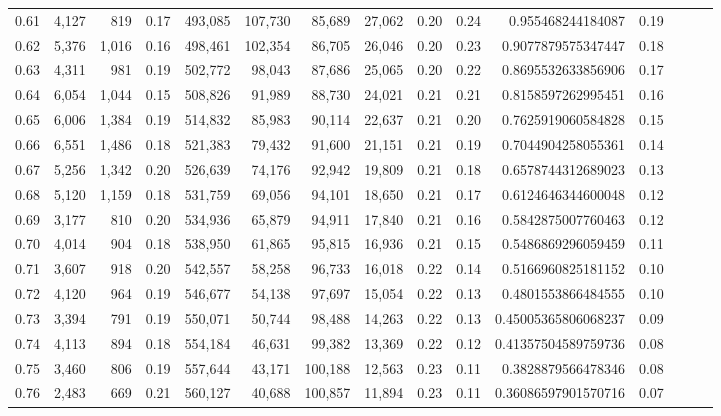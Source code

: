 \begin{tabular}{rrrrrrrrrrrrrrr}
0.61 &   4,127 &    819 &  0.17 &  493,085 &  107,730 &   85,689 &   27,062 &  0.20 &  0.24 &    0.955468244184087 &      0.19 \\
0.62 &   5,376 &  1,016 &  0.16 &  498,461 &  102,354 &   86,705 &   26,046 &  0.20 &  0.23 &   0.9077879575347447 &      0.18 \\
0.63 &   4,311 &    981 &  0.19 &  502,772 &   98,043 &   87,686 &   25,065 &  0.20 &  0.22 &   0.8695532633856906 &      0.17 \\
0.64 &   6,054 &  1,044 &  0.15 &  508,826 &   91,989 &   88,730 &   24,021 &  0.21 &  0.21 &   0.8158597262995451 &      0.16 \\
0.65 &   6,006 &  1,384 &  0.19 &  514,832 &   85,983 &   90,114 &   22,637 &  0.21 &  0.20 &   0.7625919060584828 &      0.15 \\
0.66 &   6,551 &  1,486 &  0.18 &  521,383 &   79,432 &   91,600 &   21,151 &  0.21 &  0.19 &   0.7044904258055361 &      0.14 \\
0.67 &   5,256 &  1,342 &  0.20 &  526,639 &   74,176 &   92,942 &   19,809 &  0.21 &  0.18 &   0.6578744312689023 &      0.13 \\
0.68 &   5,120 &  1,159 &  0.18 &  531,759 &   69,056 &   94,101 &   18,650 &  0.21 &  0.17 &   0.6124646344600048 &      0.12 \\
0.69 &   3,177 &    810 &  0.20 &  534,936 &   65,879 &   94,911 &   17,840 &  0.21 &  0.16 &   0.5842875007760463 &      0.12 \\
0.70 &   4,014 &    904 &  0.18 &  538,950 &   61,865 &   95,815 &   16,936 &  0.21 &  0.15 &   0.5486869296059459 &      0.11 \\
0.71 &   3,607 &    918 &  0.20 &  542,557 &   58,258 &   96,733 &   16,018 &  0.22 &  0.14 &   0.5166960825181152 &      0.10 \\
0.72 &   4,120 &    964 &  0.19 &  546,677 &   54,138 &   97,697 &   15,054 &  0.22 &  0.13 &   0.4801553866484555 &      0.10 \\
0.73 &   3,394 &    791 &  0.19 &  550,071 &   50,744 &   98,488 &   14,263 &  0.22 &  0.13 &  0.45005365806068237 &      0.09 \\
0.74 &   4,113 &    894 &  0.18 &  554,184 &   46,631 &   99,382 &   13,369 &  0.22 &  0.12 &  0.41357504589759736 &      0.08 \\
0.75 &   3,460 &    806 &  0.19 &  557,644 &   43,171 &  100,188 &   12,563 &  0.23 &  0.11 &   0.3828879566478346 &      0.08 \\
0.76 &   2,483 &    669 &  0.21 &  560,127 &   40,688 &  100,857 &   11,894 &  0.23 &  0.11 &  0.36086597901570716 &      0.07 \\

\end{tabular}

